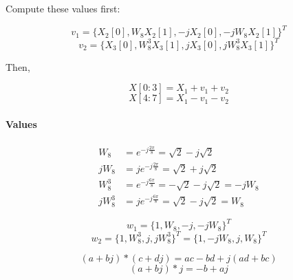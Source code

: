 \documentclass[11pt]{article}
\begin{document}
Compute these values first:

\[v_1 = \{X_2[0], W_8 X_2[1], -jX_2[0], -jW_8 X_2[1]\}^T\]
\[v_2 = \{X_3[0], W^3_8 X_3[1], jX_3[0], jW^3_8 X_3[1]\}^T\]

Then,

\[X[0:3] = X_1 + v_1 + v_2\]
\[X[4:7] = X_1 - v_1 - v_2\]

\paragraph{Values}

\[\begin{split}
	W_8 & = e^{-j\frac{2\pi}{8}} = \sqrt{2} - j\sqrt{2}\\
	jW_8 & = je^{-j\frac{2\pi}{8}} = \sqrt{2} + j\sqrt{2}\\
	W^3_8 & = e^{-j\frac{6\pi}{8}} = -\sqrt{2} - j\sqrt{2} = -jW_8\\
	jW^3_8 & = je^{-j\frac{6\pi}{8}} = \sqrt{2} - j\sqrt{2} = W_8
\end{split}\]

\[w_1 = \{1, W_8, -j, -jW_8\}^T\]
\[w_2 = \{1, W^3_8, j, jW^3_8\}^T = \{1, -jW_8, j, W_8\}^T\]

\[(a + bj) * (c + dj) = ac - bd + j(ad + bc)\]
\[(a + bj) * j = -b + aj\]
\end{document}

